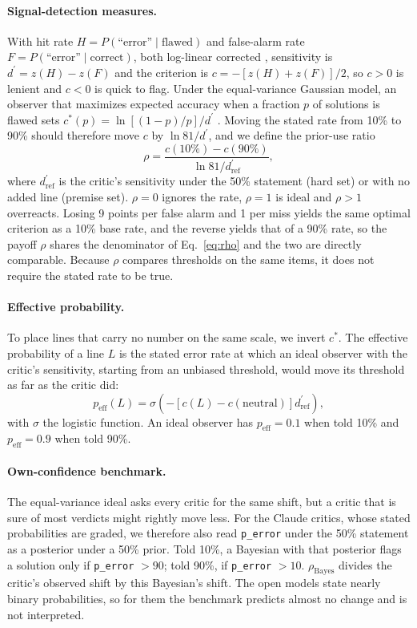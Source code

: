 \documentclass[letterpaper]{article} %
\newcommand{\dprime}{d^{\prime}}
\newcommand{\peff}{p_{\mathrm{eff}}}
\begin{document}
\paragraph{Signal-detection measures.} With hit rate $H=P(\text{``error''}\mid\text{flawed})$ and false-alarm rate $F=P(\text{``error''}\mid\text{correct})$, both log-linear corrected \citep{hautus1995corrections}, sensitivity is $\dprime=z(H)-z(F)$ and the criterion is $c=-[z(H)+z(F)]/2$, so $c>0$ is lenient and $c<0$ is quick to flag. Under the equal-variance Gaussian model, an observer that maximizes expected accuracy when a fraction $p$ of solutions is flawed sets $c^*(p)=\ln[(1-p)/p]/\dprime$ \citep{green1966signal,lynn2014utilizing}. Moving the stated rate from 10\% to 90\% should therefore move $c$ by $\ln 81/\dprime$, and we define the prior-use ratio
\begin{equation}
\rho=\frac{c(10\%)-c(90\%)}{\ln 81/\dprime_{\mathrm{ref}}},
\label{eq:rho}
\end{equation}
where $\dprime_{\mathrm{ref}}$ is the critic's sensitivity under the 50\% statement (hard set) or with no added line (premise set). $\rho=0$ ignores the rate, $\rho=1$ is ideal and $\rho>1$ overreacts. Losing 9 points per false alarm and 1 per miss yields the same optimal criterion as a 10\% base rate, and the reverse yields that of a 90\% rate, so the payoff $\rho$ shares the denominator of Eq.~\ref{eq:rho} and the two are directly comparable. Because $\rho$ compares thresholds on the same items, it does not require the stated rate to be true.

\paragraph{Effective probability.} To place lines that carry no number on the same scale, we invert $c^*$. The effective probability of a line $L$ is the stated error rate at which an ideal observer with the critic's sensitivity, starting from an unbiased threshold, would move its threshold as far as the critic did:
\begin{equation}
\peff(L)=\sigma\!\left(-\left[c(L)-c(\text{neutral})\right]\dprime_{\mathrm{ref}}\right),
\label{eq:peff}
\end{equation}
with $\sigma$ the logistic function. An ideal observer has $\peff=0.1$ when told 10\% and $\peff=0.9$ when told 90\%.

\paragraph{Own-confidence benchmark.} The equal-variance ideal asks every critic for the same shift, but a critic that is sure of most verdicts might rightly move less. For the Claude critics, whose stated probabilities are graded, we therefore also read \texttt{p\_error} under the 50\% statement as a posterior under a 50\% prior. Told 10\%, a Bayesian with that posterior flags a solution only if \texttt{p\_error} $>90$; told 90\%, if \texttt{p\_error} $>10$. $\rho_{\mathrm{Bayes}}$ divides the critic's observed shift by this Bayesian's shift. The open models state nearly binary probabilities, so for them the benchmark predicts almost no change and is not interpreted.
\end{document}
